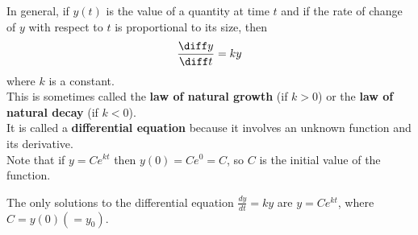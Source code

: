 \begin{frame}
In general, if $y (t)$ is the value of a quantity at time $t$ and if the rate of change of $y$ with respect to $t$ is proportional to its size, then\\
\[
\frac{\diff y}{\diff t} = ky
\]
where $k$ is a constant.\\ \pause 
 This  is sometimes called the {\bf{law of natural growth}}
 (if $k > 0$) or the {\bf{law of natural decay}} (if $k < 0$). \\ \pause 
 It is called a \textbf{differential equation} because it  involves an unknown function and its derivative.\\
 \pause 
 Note that if $ y=Ce^{kt} $ then $ y(0)=Ce^0=C$, so $ C $ is the initial value of the function.
\pause 
\begin{theorem}
The only solutions to the differential equation $\frac{dy}{dt}=ky $ are $ y=Ce^{kt}$, where $C=y(0)( = y_0)$. 
\end{theorem}              


\end{frame}
